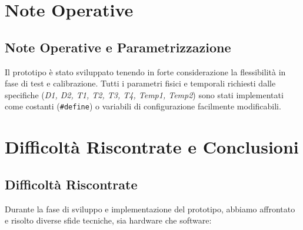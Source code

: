 \documentclass[12pt, a4paper]{article}
\begin{document}
\section{Note Operative}

\subsection{Note Operative e Parametrizzazione}
Il prototipo è stato sviluppato tenendo in forte considerazione la flessibilità in fase di test e calibrazione. Tutti i parametri fisici e temporali richiesti dalle specifiche (\textit{D1, D2, T1, T2, T3, T4, Temp1, Temp2}) sono stati implementati come costanti (\texttt{\#define}) o variabili di configurazione facilmente modificabili.


\section{Difficoltà Riscontrate e Conclusioni}

\subsection{Difficoltà Riscontrate}
Durante la fase di sviluppo e implementazione del prototipo, abbiamo affrontato e risolto diverse sfide tecniche, sia hardware che software:
\end{document}
